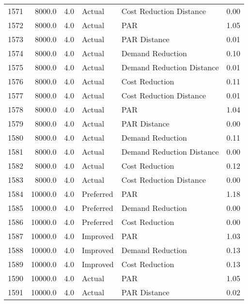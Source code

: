 \begin{longtable}{lrrllr}
1571 &       8000.0 &     4.0 &         Actual &    Cost Reduction Distance &   0.00 \\
1572 &       8000.0 &     4.0 &         Actual &                        PAR &   1.05 \\
1573 &       8000.0 &     4.0 &         Actual &               PAR Distance &   0.01 \\
1574 &       8000.0 &     4.0 &         Actual &           Demand Reduction &   0.10 \\
1575 &       8000.0 &     4.0 &         Actual &  Demand Reduction Distance &   0.01 \\
1576 &       8000.0 &     4.0 &         Actual &             Cost Reduction &   0.11 \\
1577 &       8000.0 &     4.0 &         Actual &    Cost Reduction Distance &   0.01 \\
1578 &       8000.0 &     4.0 &         Actual &                        PAR &   1.04 \\
1579 &       8000.0 &     4.0 &         Actual &               PAR Distance &   0.00 \\
1580 &       8000.0 &     4.0 &         Actual &           Demand Reduction &   0.11 \\
1581 &       8000.0 &     4.0 &         Actual &  Demand Reduction Distance &   0.00 \\
1582 &       8000.0 &     4.0 &         Actual &             Cost Reduction &   0.12 \\
1583 &       8000.0 &     4.0 &         Actual &    Cost Reduction Distance &   0.00 \\
1584 &      10000.0 &     4.0 &      Preferred &                        PAR &   1.18 \\
1585 &      10000.0 &     4.0 &      Preferred &           Demand Reduction &   0.00 \\
1586 &      10000.0 &     4.0 &      Preferred &             Cost Reduction &   0.00 \\
1587 &      10000.0 &     4.0 &       Improved &                        PAR &   1.03 \\
1588 &      10000.0 &     4.0 &       Improved &           Demand Reduction &   0.13 \\
1589 &      10000.0 &     4.0 &       Improved &             Cost Reduction &   0.13 \\
1590 &      10000.0 &     4.0 &         Actual &                        PAR &   1.05 \\
1591 &      10000.0 &     4.0 &         Actual &               PAR Distance &   0.02 \\

\end{longtable}
